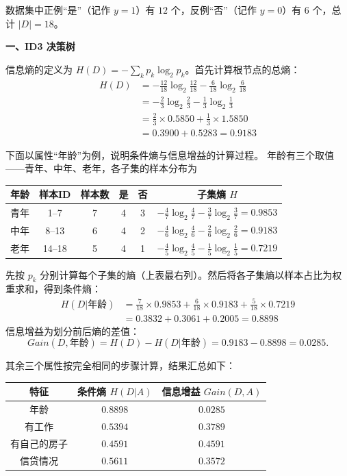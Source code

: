 \documentclass[a4, 10pt, comentarios]{aleph-notas}
\begin{document}
数据集中正例“是”（记作 $y=1$）有 $12$ 个，反例“否”（记作 $y=0$）有 $6$ 个，总计 $|D|=18$。

\textbf{一、ID3 决策树}

信息熵的定义为 $H(D)=-\sum_{k}p_k\log_2p_k$。首先计算根节点的总熵：
\[
\begin{aligned}
    H(D)&=-\frac{12}{18}\log_2\frac{12}{18}
          -\frac{6}{18}\log_2\frac{6}{18} \\
        &=-\frac{2}{3}\log_2\frac{2}{3}
          -\frac{1}{3}\log_2\frac{1}{3} \\
        &=\frac{2}{3} \times 0.5850
         +\frac{1}{3} \times 1.5850 \\
        &=0.3900+0.5283=0.9183
\end{aligned}
\]

下面以属性“年龄”为例，说明条件熵与信息增益的计算过程。
年龄有三个取值——青年、中年、老年，各子集的样本分布为
\begin{center}
\begin{tabular}{cccccc}
\toprule
年龄 & 样本ID & 样本数 & 是 & 否 & 子集熵 $H$\\
\midrule
青年 & 1--7   & 7 & 4 & 3 & $-\frac{4}{7}\log_2\frac{4}{7}-\frac{3}{7}\log_2\frac{3}{7}=0.9853$ \\[6pt]
中年 & 8--13  & 6 & 4 & 2 & $-\frac{4}{6}\log_2\frac{4}{6}-\frac{2}{6}\log_2\frac{2}{6}=0.9183$ \\[6pt]
老年 & 14--18 & 5 & 4 & 1 & $-\frac{4}{5}\log_2\frac{4}{5}-\frac{1}{5}\log_2\frac{1}{5}=0.7219$ \\
\bottomrule
\end{tabular}
\end{center}
先按 $p_k$ 分别计算每个子集的熵（上表最右列）。然后将各子集熵以样本占比为权重求和，得到条件熵：
\[
\begin{aligned}
    H(D|\text{年龄})&=\frac{7}{18} \times 0.9853 +\frac{6}{18} \times 0.9183 +\frac{5}{18} \times 0.7219 \\
    &=0.3832+0.3061+0.2005=0.8898
\end{aligned}
\]
信息增益为划分前后熵的差值：
\[
    Gain(D,\text{年龄})=H(D)-H(D|\text{年龄})=0.9183-0.8898=0.0285 .
\]

其余三个属性按完全相同的步骤计算，结果汇总如下：

\begin{center}
\begin{tabular}{ccc}
\toprule
特征 & 条件熵 $H(D|A)$ & 信息增益 $Gain(D,A)$\\
\midrule
年龄         & $0.8898$ & $0.0285$\\
有工作       & $0.5394$ & $0.3789$\\
有自己的房子 & $0.4591$ & $0.4591$\\
信贷情况     & $0.5611$ & $0.3572$\\
\bottomrule
\end{tabular}
\end{center}
\end{document}
